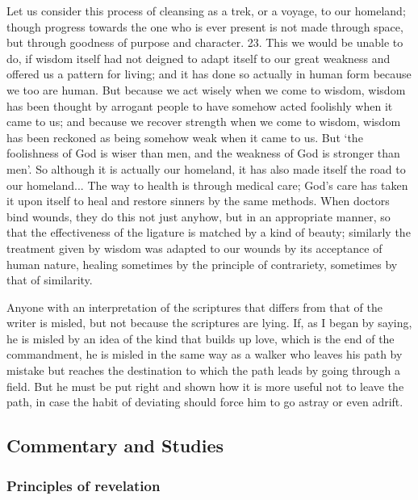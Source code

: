 			\begin{compactdesc}
				\item[DDC I:22--23, 27] Let us consider this process of cleansing as a trek, or a voyage, to our homeland; though progress towards the one who is ever present is not made through space, but through goodness of purpose and character. 23. This we would be unable to do, if wisdom itself had not deigned to adapt itself to our great weakness and offered us a pattern for living; and it has done so actually in human form because we too are human. But because we act wisely when we come to wisdom, wisdom has been thought by arrogant people to have somehow acted foolishly when it came to us; and because we recover strength when we come to wisdom, wisdom has been reckoned as being somehow weak when it came to us. But `the foolishness of God is wiser than men, and the weakness of God is stronger than men'. So although it is actually our homeland, it has also made itself the road to our homeland... The way to health is through medical care; God's care has taken it upon itself to heal and restore sinners by the same methods. When doctors bind wounds, they do this not just anyhow, but in an appropriate manner, so that the effectiveness of the ligature is matched by a kind of beauty; similarly the treatment given by wisdom was adapted to our wounds by its acceptance of human nature, healing sometimes by the principle of contrariety, sometimes by that of similarity.
				\item[DDC I:88] Anyone with an interpretation of the scriptures that differs from that of the writer is misled, but not because the scriptures are lying. If, as I began by saying, he is misled by an idea of the kind that builds up love, which is the end of the commandment, he is misled in the same way as a walker who leaves his path by mistake but reaches the destination to which the path leads by going through a field. But he must be put right and shown how it is more useful not to leave the path, in case the habit of deviating should force him to go astray or even adrift. 
			\end{compactdesc}
	
\subsection{Commentary and Studies} %
	\label{EPIST-REVELATION-COMMENTARY}

	\subsubsection{Principles of revelation}
		\label{EPIST-REVELATION-principles}
	
